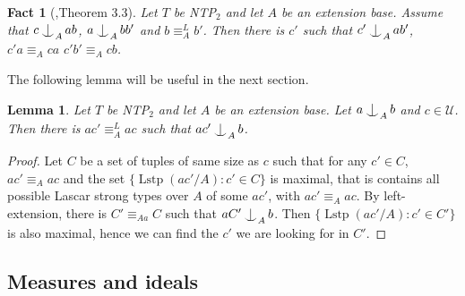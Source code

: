 \documentclass{amsart}
\makeatletter
\numberwithin{equation}{section}
\newtheorem{lemme}[thm]{Lemma}
\newtheorem{fait}[thm]{Fact}
\theoremstyle{definition}
\theoremstyle{mystyle}
\theoremstyle{remark}
\newcommand{\monster}{\mathcal U}
\DeclareMathOperator{\Lstp}{Lstp}
\def\indsym#1#2{%
 \setbox0=\hbox{$\m@th#1x$}%
 \kern\wd0%
 \hbox to 0pt{\hss$\m@th#1\mid$\hbox to 0pt{$\m@th#1^{#2}$\hss}\hss}%
 \lower.9\ht0\hbox to 0pt{\hss$\m@th#1\smile$\hss}%
 \kern\wd0}
\newcommand{\ind}[1][]{\mathop{\mathpalette\indsym{#1}}}
\makeatother
\begin{document}
\begin{fait}[\cite{CherBY},Theorem 3.3]\label{f_amal}
Let $T$ be NTP$_2$ and let $A$ be an extension base. Assume that $c\ind_A ab$, $a\ind_A bb'$ and $b\equiv^ L_A b'$. Then there is $c'$ such that $c' \ind_A ab'$, $c'a \equiv_A ca$ $c'b' \equiv_A cb$.
\end{fait}

%
The following lemma will be useful in the next section.

\begin{lemme}\label{lem_lascarext}
Let $T$ be NTP$_2$ and let $A$ be an extension base. Let $a \ind_A b$ and $c\in \monster$. Then there is $ac'\equiv_A^L ac$ such that $ac'\ind_A b$.
\end{lemme}
\begin{proof}
Let $C$ be a set of tuples of same size as $c$ such that for any $c'\in C$, $ac'\equiv_A ac$ and the set $\{\Lstp(ac'/A) : c'\in C\}$ is maximal, that is contains all possible Lascar strong types over $A$ of some $ac'$, with $ac'\equiv_A ac$. By left-extension, there is $C'\equiv_{Aa} C$ such that $aC' \ind_A b$. Then $\{\Lstp(ac'/A) : c'\in C'\}$ is also maximal, hence we can find the $c'$ we are looking for in $C'$.
\end{proof}

\subsection{Measures and ideals}
\end{document}

